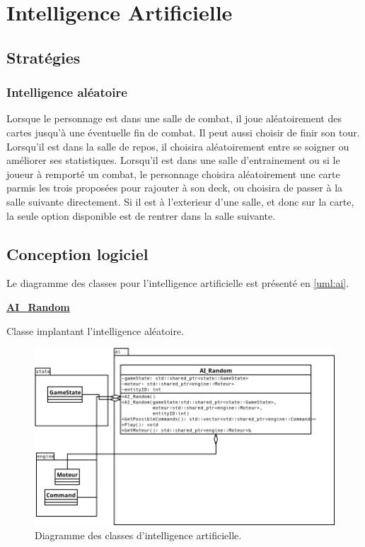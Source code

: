 \section{Intelligence Artificielle}

\subsection{Stratégies}
\subsubsection{Intelligence aléatoire}
Lorsque le personnage est dans une salle de combat, il joue aléatoirement des cartes jusqu'à une éventuelle fin de combat. Il peut aussi choisir de finir son tour. Lorsqu'il est dans la salle de repos, il choisira aléatoirement entre se soigner ou améliorer ses statistiques. Lorsqu'il est dans une salle d'entrainement ou si le joueur à remporté un combat, le personnage choisira aléatoirement une carte parmis les trois proposées pour rajouter à son deck, ou choisira de passer à la salle suivante directement. Si il est à l'exterieur d'une salle, et donc sur la carte, la seule option disponible est de rentrer dans la salle suivante.
\clearpage

\subsection{Conception logiciel}
Le diagramme des classes pour l’intelligence artificielle est présenté en \autoref{uml:ai}.

\underline{\textbf{AI\_Random}}
\par Classe implantant l'intelligence aléatoire.

\clearpage

\begin{figure}[hp]
\includegraphics[width=0.6\paperheight]{images/ai.png}
\caption{\label{uml:ai}Diagramme des classes d'intelligence artificielle.} 
\end{figure}

\clearpage
